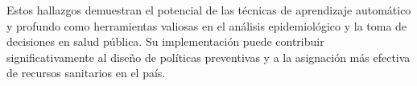 Estos hallazgos demuestran el potencial de las técnicas de aprendizaje automático y profundo como herramientas valiosas en el análisis epidemiológico y la toma de decisiones en salud pública. Su implementación puede contribuir significativamente al diseño de políticas preventivas y a la asignación más efectiva de recursos sanitarios en el país. \\ 